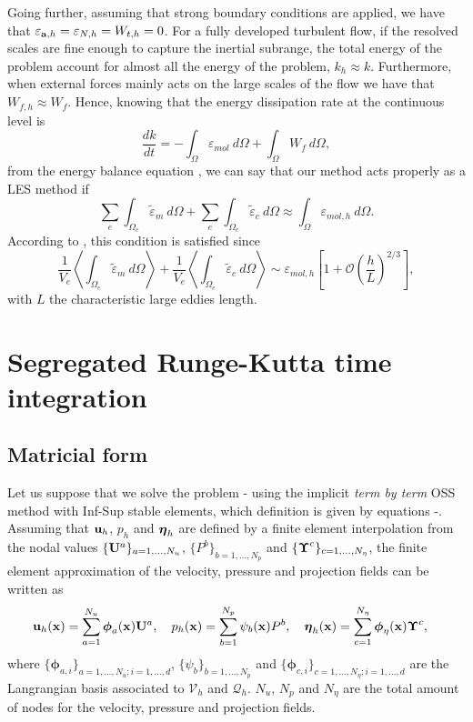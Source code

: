 Going further, assuming that strong boundary conditions are applied, we have that $ \varepsilon_{{\bf a},h}=\varepsilon_{N,h}=W_{t,h}=0 $. For a fully developed turbulent flow, if the resolved scales are fine enough to capture the inertial subrange, the total energy of the problem account for almost all the energy of the problem, $ k_h\approx k $. Furthermore, when external forces mainly acts on the large scales of the flow we have that $ W_{f,h}\approx W_f $. Hence, knowing that the energy dissipation rate at the continuous level is
$$ \frac{dk}{dt}=-\int_{\Omega}\varepsilon_{mol}\ d\Omega+\int_{\Omega}W_{f}\ d\Omega, $$
from the energy balance equation , we can say that our method acts properly as a LES method if
$$ \sum_e\int_{\Omega_e}\widetilde{\varepsilon}_m\ d\Omega+\sum_e\int_{\Omega_e}\widetilde{\varepsilon}_c\ d\Omega\approx\int_{\Omega}\varepsilon_{mol,h}\ d\Omega. $$
According to \cite{guasch_statistical_2013}, this condition is satisfied since 
$$ \frac{1}{V_e}\left\langle\int_{\Omega_e}\widetilde{\varepsilon}_m\ d\Omega\right\rangle + \frac{1}{V_e}\left\langle\int_{\Omega_e}\widetilde{\varepsilon}_c\ d\Omega\right\rangle\sim\varepsilon_{mol,h}\left[1+\mathcal{O}\left(\frac{h}{L}\right)^{2/3}\right], $$
with $ L $ the characteristic large eddies length.

\section{Segregated Runge-Kutta time integration}
\label{sec-C7_SRK}
\subsection{Matricial form}
Let us suppose that we solve the problem - using the implicit \textit{term by term} OSS method with Inf-Sup stable elements, which definition is given by equations -. Assuming that ${\bf u}_h$, $p_h$ and $\boldsymbol{\eta}_h$ are defined by a finite element interpolation from the nodal values $\{{\bf U}^a\}_{a=1,...,N_u}$, $\{P^b\}_{b=1,...,N_p}$ and $\{\boldsymbol{\Upsilon}^c\}_{c=1,...,N_\eta}$, the finite element approximation of the velocity, pressure and projection fields can be written as
\begin{align*}
&{\bf u}_h({\bf x})=\sum_{a=1}^{N_u}\boldsymbol{\phi}_a({\bf x}){\bf U}^a,\quad p_h({\bf x})=\sum_{b=1}^{N_p}\psi_b({\bf x})P^b,\quad \boldsymbol{\eta}_h({\bf x})=\sum_{c=1}^{N_\eta}\boldsymbol{\phi}_\eta({\bf x})\boldsymbol{\Upsilon}^c,
\end{align*}
where $\{\boldsymbol{\phi}_{a,i}\}_{a=1,...,N_u;i=1,...,d}$, $\{\psi_b\}_{b=1,...,N_p}$ and $\{\boldsymbol{\phi}_{c,i}\}_{c=1,...,N_\eta;i=1,...,d}$ are the Langrangian basis associated to $\mathcal{V}_h$ and $\mathcal{Q}_h$. $N_u$, $N_p$ and $N_\eta$ are the total amount of nodes for the velocity, pressure and projection fields. 

